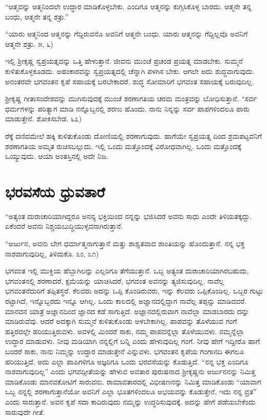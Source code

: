 “ಆತ್ಮವನ್ನು ಆತ್ಮನಿಂದಲೇ ಉದ್ಧಾರ ಮಾಡಿಕೊಳ್ಳಬೇಕು. ಎಂದಿಗೂ ಆತ್ಮನನ್ನು ಕುಗ್ಗಿಸಿಕೊಳ್ಳ ಬಾರದು. ಆತ್ಮನೇ ತನ್ನ ಬಂಧು, ಆತ್ಮನೇ ತನ್ನ ಶತ್ರು.”

“ಯಾರು ಆತ್ಮನಿಂದ ಆತ್ಮನನ್ನು ಗೆದ್ದಿರುವನೊ ಅವನಿಗೆ ಆತ್ಮನೇ ಬಂಧು. ಯಾರು ಆತ್ಮನನ್ನು ಗೆದ್ದಿಲ್ಲವೊ ಅವನಿಗೆ ಆತ್ಮನೇ ಶತ್ರು. ೫, ೬)

ಇಲ್ಲಿ ಶ್ರೀಕೃಷ್ಣ ಸ್ವಪ್ರಯತ್ನವನ್ನು ಒತ್ತಿ ಹೇಳುತ್ತಾನೆ. ಜೀವನು ಮುಂಚೆ ಪ್ರಚಂಡ ಪ್ರಯತ್ನ ಮಾಡಬೇಕು. ಸುಮ್ಮನೆ ಕುಳಿತುಕೊಳ್ಳಕೂಡದು. ಅಹಂಕಾರವನ್ನು ಸ್ವಪ್ರಯತ್ನದಲ್ಲಿ ಚೆನ್ನಾಗಿ ಪಳಗಿಸ ಬೇಕು. ಆಗಲೇ ಅದು ಶುದ್ಧವಾಗುವುದು. ಅನಂತರವೇ ಭಗವಂತನ ಕೃಪೆ ಸಹಾಯಕ್ಕೆ ಬರಬೇಕಾದರೆ. ಶುದ್ಧ ಸೋಮಾರಿಗೆ ಭಗವಂತ ಸಹಾಯಕ್ಕೆ ಬರುವುದಿಲ್ಲ.

ಶ್ರೀಕೃಷ್ಣ ಗೀತಾಸಂದೇಶವನ್ನು ಮುಗಿಸುವುದಕ್ಕೆ ಮುಂಚೆ ಶರಣಾಗತಿಯ ಚರಮ ಮಂತ್ರವನ್ನು ಬೋಧಿಸುತ್ತಾನೆ. “ಸರ್ವ ಧರ್ಮಗಳನ್ನು ಪರಿತ್ಯಾಗ ಮಾಡಿ ನನ್ನೊಬ್ಬನಲ್ಲಿ ಶರಣು ಹೊಂದು. ನಾನು ನಿನ್ನನ್ನು ಸರ್ವ ಪಾಪಗಳಿಂದಲೂ ಪಾರು ಮಾಡುತ್ತೇನೆ. ಶೋಕಿಸಬೇಡ. ೬೭)

ರೆಕ್ಕೆ ದಣಿದಮೇಲೆ ಹಕ್ಕಿ ಕುಳಿತುಕೊಂಡು ದೋಣಿಯಲ್ಲಿ ಶರಣಾಗುವುದು. ಹಾಗೆಯೇ ಸ್ವಪ್ರಯತ್ನ ದಿಂದ ಶ್ರಮಪಟ್ಟವನಿಗೆ ಶರಣಾಗತಿಯ ಅಮೃತ ರುಚಿಸಬಲ್ಲುದು. ಇಲ್ಲಿ ಒಂದು ಮತ್ತೊಂದಕ್ಕೆ ವಿರೋಧವಾಗಿಲ್ಲ. ಒಂದು ಮತ್ತೊಂದಕ್ಕೆ ಒಯ್ಯುವುದು. ಆಯಾ ಅಂತಸ್ತಿನಲ್ಲಿ ಅದೇ ನಿಜ.


\section*{ಭರವಸೆಯ ಧ್ರುವತಾರೆ}

“ಅತ್ಯಂತ ದುರಾಚಾರಿಯಾಗಿದ್ದರೂ ಅನನ್ಯ ಭಕ್ತಿಯಿಂದ ನನ್ನನ್ನು ಭಜಿಸಿದರೆ ಅವನು ಸಾಧು ಎಂದೇ ತಿಳಿಯತಕ್ಕದ್ದು. ಏಕೆಂದರೆ ಅವನು ನಿಶ್ಚಯಬುದ್ಧಿಯುಳ್ಳವನಾಗಿರುತ್ತಾನೆ.

“ಅರ್ಜುನ, ಅವನು ಬೇಗ ಧರ್ಮಾತ್ಮನಾಗುತ್ತಾನೆ ಮತ್ತು ಶಾಶ್ವತವಾದ ಶಾಂತಿಯನ್ನು ಹೊಂದುತ್ತಾನೆ. ನನ್ನ ಭಕ್ತ ನಾಶವಾಗುವುದಿಲ್ಲ, ತಿಳಿದುಕೊ. ೩ಂ, ೩೧)

ಭಗವಂತ ಇಲ್ಲಿ ಮುಕ್ತಿಯ ಹೆಬ್ಬಾಗಿಲನ್ನು ಎಲ್ಲರಿಗೂ ತೆಗೆಯುತ್ತಾನೆ. ಒಬ್ಬ ಅತ್ಯಂತ ದುರಾಚಾರಿಯಾಗಿರಬಹುದು, ಭಗವಂತನಲ್ಲಿ ಶರಣಾದರೆ, ಕ್ಷಮೆಯನ್ನು ಯಾಚಿಸಿದರೆ, ಭಗವಂತ ಅವನನ್ನು ತ್ಯಜಿಸುವುದಿಲ್ಲ. ನಾವೆಲ್ಲ ಭಗವಂತನೆದುರಿಗೆ ತಪ್ಪಿತಸ್ಥರೆ. ಕೆಲವರು ಅದನ್ನು ಒಪ್ಪಿ ಕೊಂಡಿರುವರು, ಇನ್ನು ಕೆಲವರು ಒಪ್ಪಿಕೊಂಡಿಲ್ಲ. ಒಬ್ಬರ ಗುಟ್ಟು ರಟ್ಟಾಗಿದೆ, ಇನ್ನೊಬ್ಬರದು ಇನ್ನೂ ಆಗಿಲ್ಲ. ಒಂದು ಕಾಲದಲ್ಲಿ ಅಜ್ಞಾನದಲ್ಲಿದ್ದಾಗ ನಾವೆಲ್ಲ ತಪ್ಪನ್ನು ಮಾಡಿದವರೆ. ಮಾನವನ ಯಾತ್ರೆ ಅಜ್ಞಾನದಿಂದ ಜ್ಞಾನದ ಕಡೆ ಸಾಗುತ್ತಿದೆ. ಅಜ್ಞಾನದಲ್ಲಿರುವಾಗ ನಾವೆಲ್ಲಾ ಮಾಡಬಾರದು ದನ್ನು ಮಾಡಿರುವೆವು. ಆದರೆ ಅದಕ್ಕಾಗಿ ಸುಮ್ಮನೆ ಕುಳಿತುಕೊಂಡು ಅಳಬೇಕಾಗಿಲ್ಲ. ಪಾಪವನ್ನು ತೊಳೆಯುವ ಗಂಗೆ ಹತ್ತಿರದಲ್ಲೇ ಹರಿಯುತ್ತಿರುವಳು. ಅವಳಲ್ಲಿ ಮಿಂದರೆ ಸಾಕು, ನಮ್ಮ ಪಾಪವನ್ನೆಲ್ಲಾ ತೊಳೆಯುವಳು. ನಮ್ಮನ್ನೆಲ್ಲಾ ಉದ್ಧಾರ ಮಾಡುವಳು. ನೀವು ಮಡಿಯಾಗಿ ನನ್ನಲ್ಲಿಗೆ ಬನ್ನಿ ಎಂದು ಹೇಳುವುದಿಲ್ಲ ಗಂಗೆ. ನೀವು ಹೇಗೆ ಇದ್ದೀರೊ ಹಾಗೆ ಬಂದರೆ ಸಾಕು, ನಾನು ನಿಮ್ಮನ್ನು ಉದ್ಧಾರ ಮಾಡುತ್ತೇನೆ ಎನ್ನುವಳು. ಭಗವಂತನ ಕೃಪೆಯ ಗಂಗಾನದಿ ಈಗಲೂ ಹರಿಯುತ್ತಿದೆ. ಅದು ಎಲ್ಲಾ ಪಾಪಿಗಳಿಗೂ ಅಜ್ಞರಿಗೂ ಒಂದು ಭರವಸೆಯನ್ನು ಕೊಡುತ್ತಿದೆ. “ನನ್ನ ಭಕ್ತ ಎಂದಿಗೂ ನಾಶವಾಗುವುದಿಲ್ಲ” ಎಂದು ಭಗವದ್ಗೀತೆಯನ್ನು ಹೇಳುವ ಅವತಾರ ಪುರುಷನಾದ ಶ್ರೀಕೃಷ್ಣನು ಅರ್ಜುನನನ್ನು ನಿಮಿತ್ತ ಮಾಡಿಕೊಂಡು ಮಾನವಕೋಟಿಗೆ ಸಾರುವನು. ರಾಮಾವತಾರದಲ್ಲಿ ವಿಭೀಷಣನನ್ನು ನಿಮಿತ್ತ ಮಾಡಿಕೊಂಡು “ಯಾವಾಗ ಒಬ್ಬ ನನ್ನಲ್ಲಿ ಶರಣಾಗುತ್ತಾನೆಯೋ ಅವನಿಗೆ ಎಲ್ಲಾ ಭೂತಗಳಿಂದಲೂ ಅಭಯವನ್ನು ಕೊಡುತ್ತೇನೆ, ಇದು ನನ್ನ ವ್ರತ” ಎಂದು ಸಾರುತ್ತಾನೆ. ಅವನ ಕೃಪೆ ಸದಾ ಕಾದಿರುವುದು ನಮ್ಮನ್ನು ಉದ್ಧರಿಸುವುದಕ್ಕೆ. ಅದನ್ನು ಹೇಗೆ ಪಡೆಯಬೇಕೆಂದು ಸಾರುವುದೇ ಗೀತೆ.

